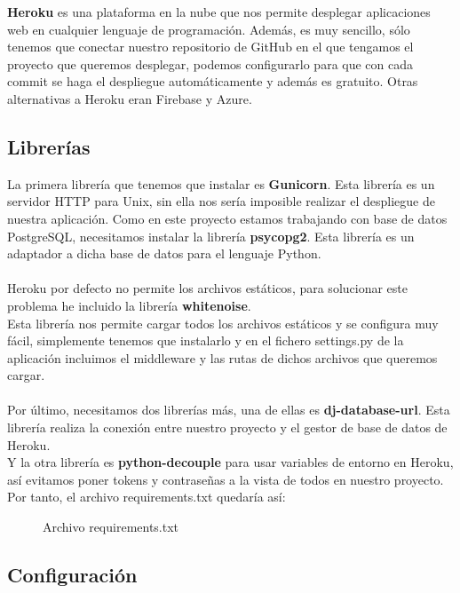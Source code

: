 \textbf{Heroku} es una plataforma en la nube que nos permite desplegar aplicaciones web en cualquier lenguaje de programación.
Además, es muy sencillo, sólo tenemos que conectar nuestro repositorio de GitHub en el que tengamos el proyecto que queremos desplegar,
podemos configurarlo para que con cada commit se haga el despliegue automáticamente y además es gratuito. Otras alternativas a Heroku 
eran Firebase y Azure.

\subsection{Librerías}

La primera librería que tenemos que instalar es \textbf{Gunicorn}. Esta librería es un servidor HTTP para Unix, sin ella nos sería imposible realizar el despliegue de nuestra aplicación.
Como en este proyecto estamos trabajando con base de datos PostgreSQL, necesitamos instalar la librería \textbf{psycopg2}. Esta librería es un adaptador a dicha base de datos para el lenguaje Python.\\\\
Heroku por defecto no permite los archivos estáticos, para solucionar este problema he incluido la librería \textbf{whitenoise}.\\
Esta librería nos permite cargar todos los archivos estáticos y se configura muy fácil, simplemente tenemos que instalarlo y en
el fichero settings.py de la aplicación incluimos el middleware y las rutas de dichos archivos que queremos cargar.\\\\
Por último, necesitamos dos librerías más, una de ellas es \textbf{dj-database-url}. Esta librería realiza la conexión entre nuestro proyecto y el gestor de base de datos de Heroku.\\
Y la otra librería es \textbf{python-decouple} para usar variables de entorno en Heroku, así evitamos poner tokens y contraseñas a la vista de todos en nuestro proyecto. \\

Por tanto, el archivo requirements.txt quedaría así:
\begin{figure}[H]
  \centering
  \noindent{}
  \caption{Archivo requirements.txt}
\end{figure}


\subsection{Configuración}

